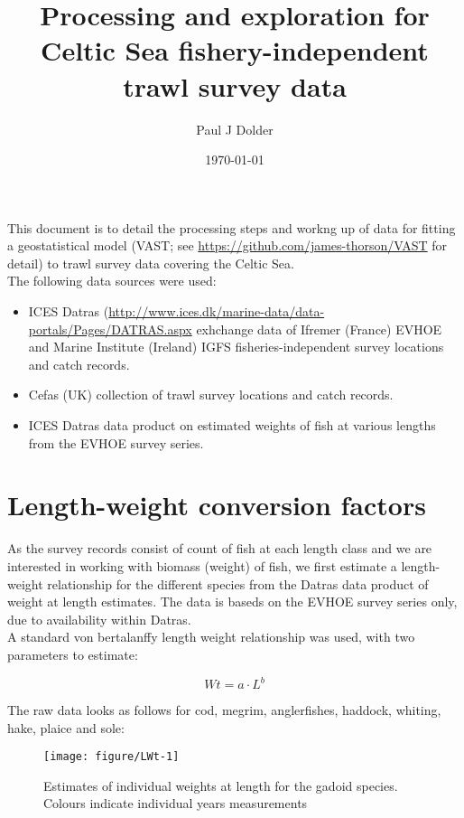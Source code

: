 \documentclass[12pt]{article}\usepackage[]{graphicx}\usepackage[]{color}
\title{Processing and exploration for Celtic Sea fishery-independent trawl
	survey data}
\author{Paul J Dolder}
\date{\today}
\makeatletter
\def\maxwidth{ %
  \ifdim\Gin@nat@width>\linewidth
    \linewidth
  \else
    \Gin@nat@width
  \fi
}
\newenvironment{knitrout}{}{} %
\makeatother
\begin{document}
\maketitle

This document is to detail the processing steps and workng up of data for fitting
a geostatistical model (VAST; see \url{https://github.com/james-thorson/VAST}
for detail) to trawl survey data covering the Celtic Sea. \\

The following data sources were used:

\begin{itemize}
	\item ICES Datras
		(\url{http://www.ices.dk/marine-data/data-portals/Pages/DATRAS.aspx}
		exhchange data of Ifremer (France) EVHOE and Marine Institute
		(Ireland) IGFS fisheries-independent survey locations and catch
		records.
	\item Cefas (UK) collection of trawl survey locations and catch
		records.
	\item ICES Datras data product on estimated weights of fish at various
		lengths from the EVHOE survey series.
\end{itemize}

\section{Length-weight conversion factors}

As the survey records consist of count of fish at each length class and we are
interested in working with biomass (weight) of fish, we first estimate a
length-weight relationship for the different species from the Datras data
product of weight at length estimates. The data is baseds on the EVHOE survey
series only, due to availability within Datras. \\

A standard von bertalanffy length weight relationship was used, with two
parameters to estimate:

\begin{equation}\label{eq:1}
	Wt = a \cdot L^b
\end{equation}

The raw data looks as follows for cod, megrim, anglerfishes, haddock, whiting,
hake, plaice and sole:

\begin{knitrout}\footnotesize
{}\color{fgcolor}\begin{figure}
\texttt{[image: figure/LWt-1]} \caption[Estimates of individual weights at length for the gadoid species]{Estimates of individual weights at length for the gadoid species. Colours indicate individual years measurements}\label{fig:LWt}
\end{figure}


\end{knitrout}
\end{document}
